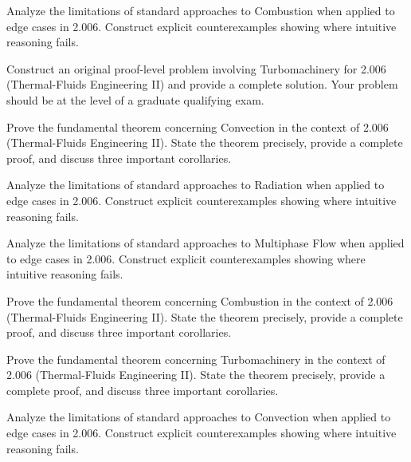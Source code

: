 \documentclass[12pt,a4paper]{exam}
\begin{document}
\begin{questions}
\vspace{0.3cm}

\question[2]
Analyze the limitations of standard approaches to Combustion when applied to edge cases in 2.006. Construct explicit counterexamples showing where intuitive reasoning fails.

\vspace{0.3cm}

\question[3]
Construct an original proof-level problem involving Turbomachinery for 2.006 (Thermal-Fluids Engineering II) and provide a complete solution. Your problem should be at the level of a graduate qualifying exam.

\vspace{0.3cm}

\question[5]
Prove the fundamental theorem concerning Convection in the context of 2.006 (Thermal-Fluids Engineering II). State the theorem precisely, provide a complete proof, and discuss three important corollaries.

\vspace{0.3cm}

\question[5]
Analyze the limitations of standard approaches to Radiation when applied to edge cases in 2.006. Construct explicit counterexamples showing where intuitive reasoning fails.

\vspace{0.3cm}

\question[6]
Analyze the limitations of standard approaches to Multiphase Flow when applied to edge cases in 2.006. Construct explicit counterexamples showing where intuitive reasoning fails.

\vspace{0.3cm}

\question[5]
Prove the fundamental theorem concerning Combustion in the context of 2.006 (Thermal-Fluids Engineering II). State the theorem precisely, provide a complete proof, and discuss three important corollaries.

\vspace{0.3cm}

\question[4]
Prove the fundamental theorem concerning Turbomachinery in the context of 2.006 (Thermal-Fluids Engineering II). State the theorem precisely, provide a complete proof, and discuss three important corollaries.

\vspace{0.3cm}

\question[2]
Analyze the limitations of standard approaches to Convection when applied to edge cases in 2.006. Construct explicit counterexamples showing where intuitive reasoning fails.


\end{questions}
\end{document}
